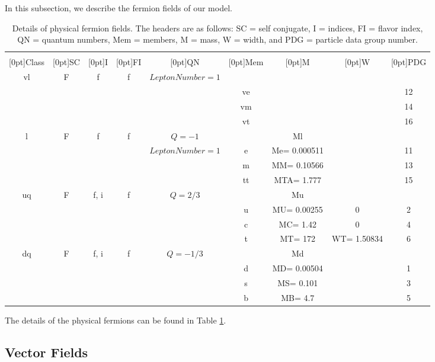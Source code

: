 In this subsection, we describe the fermion fields of our model.  \begin{table}[!h]
\begin{center}
\begin{tabular}{|c|c|c|c|c|c|c|c|c|}
\hline
 &  &  &  &  &  &  &  & \\
\raisebox{1.5ex}[0pt]{Class} & \raisebox{1.5ex}[0pt]{SC} & \raisebox{1.5ex}[0pt]{I} & \raisebox{1.5ex}[0pt]{FI} & \raisebox{1.5ex}[0pt]{QN} & \raisebox{1.5ex}[0pt]{Mem} & \raisebox{1.5ex}[0pt]{M} & \raisebox{1.5ex}[0pt]{W} & \raisebox{1.5ex}[0pt]{PDG}\\
\hline\hline
vl & F & {f} & {f} & $LeptonNumber = 1$ &  &  &  & \\
 &  & &  & & ve &  &  & 12\\
 &  & &  & & vm &  &  & 14\\
 &  & &  & & vt &  &  & 16\\
l & F & {f} & {f} & $Q = -1$ &  & Ml &  & \\
 &  & &  & $LeptonNumber = 1$ & e & {Me= 0.000511} &  & 11\\
 &  & &  & & m & {MM= 0.10566} &  & 13\\
 &  & &  & & tt & {MTA= 1.777} &  & 15\\
uq & F & {f, i} & {f} & $Q = 2/3$ &  & Mu &  & \\
 &  & &  & & u & {MU= 0.00255} & 0 & 2\\
 &  & &  & & c & {MC= 1.42} & 0 & 4\\
 &  & &  & & t & {MT= 172} & {WT= 1.50834} & 6\\
dq & F & {f, i} & {f} & $Q = -1/3$ &  & Md &  & \\
 &  & &  & & d & {MD= 0.00504} &  & 1\\
 &  & &  & & s & {MS= 0.101} &  & 3\\
 &  & &  & & b & {MB= 4.7} &  & 5\\
\hline
\end{tabular}
\caption[Physical Fermion Fields]{\label{tab:fermions:physical:1}Details of physical fermion fields.  The headers are as follows:  SC = self conjugate, I = indices, FI = flavor index, QN = quantum numbers, Mem = members, M = mass, W = width, and PDG = particle data group number.}
\end{center}
\end{table}
The details of the physical fermions can be found in Table \ref{tab:fermions:physical:1}.  \subsection{\label{vectors}Vector Fields}
